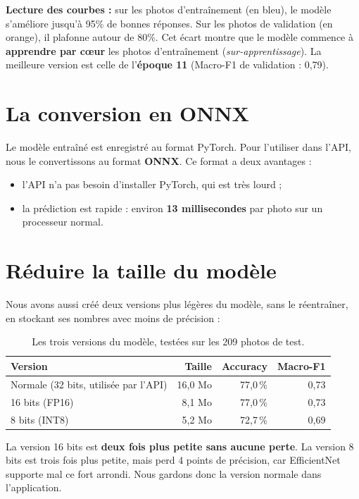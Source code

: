 \documentclass[11pt,a4paper]{report}
\begin{document}
\noindent \textbf{Lecture des courbes :} sur les photos d'entraînement (en bleu), le modèle
s'améliore jusqu'à 95\% de bonnes réponses. Sur les photos de validation (en orange), il
plafonne autour de 80\%. Cet écart montre que le modèle commence à \textbf{apprendre par
cœur} les photos d'entraînement (\textit{sur-apprentissage}). La meilleure version est celle
de l'\textbf{époque 11} (Macro-F1 de validation : 0,79).

\section{La conversion en ONNX}

Le modèle entraîné est enregistré au format PyTorch. Pour l'utiliser dans l'API, nous le
convertissons au format \textbf{ONNX}. Ce format a deux avantages :
\begin{itemize}[noitemsep,topsep=4pt]
    \item l'API n'a pas besoin d'installer PyTorch, qui est très lourd ;
    \item la prédiction est rapide : environ \textbf{13 millisecondes} par photo sur un processeur normal.
\end{itemize}

\section{Réduire la taille du modèle}

Nous avons aussi créé deux versions plus légères du modèle, sans le réentraîner, en
stockant ses nombres avec moins de précision :

\begin{table}[H]
    \centering
    \caption{Les trois versions du modèle, testées sur les 209 photos de test.}
    \label{tab:quant}
    \begin{tabular}{lrrr}
        \toprule
        \textbf{Version} & \textbf{Taille} & \textbf{Accuracy} & \textbf{Macro-F1} \\
        \midrule
        Normale (32 bits, utilisée par l'API) & 16,0 Mo & 77,0\,\% & 0,73 \\
        16 bits (FP16) & 8,1 Mo & 77,0\,\% & 0,73 \\
        8 bits (INT8)  & 5,2 Mo & 72,7\,\% & 0,69 \\
        \bottomrule
    \end{tabular}
\end{table}

\noindent La version 16 bits est \textbf{deux fois plus petite sans aucune perte}. La version
8 bits est trois fois plus petite, mais perd 4 points de précision, car EfficientNet supporte
mal ce fort arrondi. Nous gardons donc la version normale dans l'application.
\end{document}
